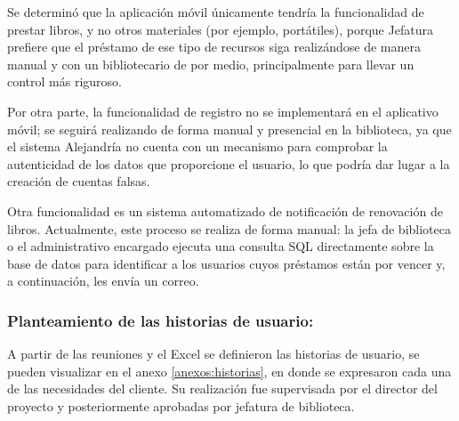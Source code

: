 \documentclass[spanish]{ieee_upb}
\begin{document}
Se determinó que la aplicación móvil únicamente tendría la funcionalidad de prestar libros, y no otros materiales (por ejemplo, portátiles), porque Jefatura prefiere que el préstamo de ese tipo de recursos siga realizándose de manera manual y con un bibliotecario de por medio, principalmente para llevar un control más riguroso.
\vspace{0.3 cm}

Por otra parte, la funcionalidad de registro no se implementará en el aplicativo móvil; se seguirá realizando de forma manual y presencial en la biblioteca, ya que el sistema Alejandría no cuenta con un mecanismo para comprobar la autenticidad de los datos que proporcione el usuario, lo que podría dar lugar a la creación de cuentas falsas.
\vspace{0.3 cm}

 Otra funcionalidad es un sistema automatizado de notificación de renovación de libros. Actualmente, este proceso se realiza de forma manual: la jefa de biblioteca o el administrativo encargado ejecuta una consulta SQL directamente sobre la base de datos para identificar a los usuarios cuyos préstamos están por vencer y, a continuación, les envía un correo. 

\subsubsection{ Planteamiento de las historias de usuario:}
 A partir de las reuniones y el Excel se  definieron las historias de usuario, se pueden visualizar en el anexo \ref{anexos:historias}, en donde se expresaron cada una de las necesidades del cliente.  Su realización fue supervisada por el director del proyecto y posteriormente aprobadas por jefatura de biblioteca. 

 \begin{table}[H]
\centering
{}
 \end{table}
\end{document}
